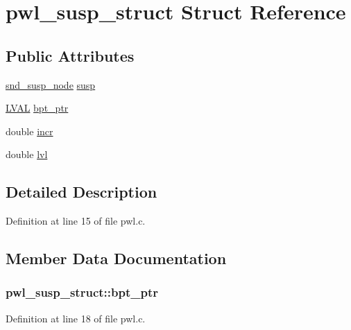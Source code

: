 \hypertarget{structpwl__susp__struct}{}\section{pwl\+\_\+susp\+\_\+struct Struct Reference}
\label{structpwl__susp__struct}
\subsection*{Public Attributes}
\begin{DoxyCompactItemize}
\item 
\hyperlink{sound_8h_a6b268203688a934bd798ceb55f85d4c0}{snd\+\_\+susp\+\_\+node} \hyperlink{structpwl__susp__struct_aa7becf7ae484f52e935c38e41ee6344c}{susp}
\item 
\hyperlink{xldmem_8h_a9a9ec6a5fbca2b40ed8d19faa799be8c}{L\+V\+AL} \hyperlink{structpwl__susp__struct_a89f56fcc8357f822027e484cacf472a5}{bpt\+\_\+ptr}
\item 
double \hyperlink{structpwl__susp__struct_ad391b054997dfbc02a588f55aae285ea}{incr}
\item 
double \hyperlink{structpwl__susp__struct_ad7e05416ac642655c140e9fa0eb6ba5d}{lvl}
\end{DoxyCompactItemize}


\subsection{Detailed Description}


Definition at line 15 of file pwl.\+c.



\subsection{Member Data Documentation}
\subsubsection[{\texorpdfstring{bpt\+\_\+ptr}{bpt_ptr}}]{ pwl\+\_\+susp\+\_\+struct\+::bpt\+\_\+ptr}\hypertarget{structpwl__susp__struct_a89f56fcc8357f822027e484cacf472a5}{}\label{structpwl__susp__struct_a89f56fcc8357f822027e484cacf472a5}


Definition at line 18 of file pwl.\+c.

